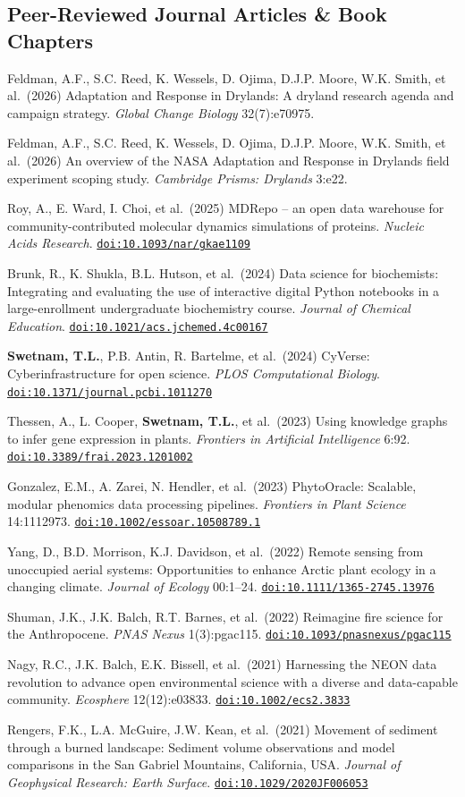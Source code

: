 \documentclass[11pt,letterpaper]{article}
\newcommand{\me}{\textbf{Swetnam, T.L.}}
\newcommand{\doi}[1]{\href{https://doi.org/#1}{\nolinkurl{doi:#1}}}
\newcounter{revno}
\newenvironment{revlist}[1]
  {\setcounter{revno}{#1}\stepcounter{revno}%
   \begin{list}{}{\setlength{\leftmargin}{2.1em}\setlength{\labelwidth}{1.7em}%
     \setlength{\labelsep}{0.4em}\setlength{\itemsep}{3.5pt}\setlength{\parsep}{0pt}\setlength{\topsep}{2pt}}}
  {\end{list}}
\newcommand{\pub}{\addtocounter{revno}{-1}\item[{\small\color{muted}\arabic{revno}.}]}
\begin{document}
\subsection{Peer-Reviewed Journal Articles \& Book Chapters}
\begin{revlist}{40}
\pub Feldman, A.F., S.C. Reed, K. Wessels, D. Ojima, D.J.P. Moore, W.K. Smith, et al.\ (2026) Adaptation and Response in Drylands: A dryland research agenda and campaign strategy. \textit{Global Change Biology} 32(7):e70975.
\pub Feldman, A.F., S.C. Reed, K. Wessels, D. Ojima, D.J.P. Moore, W.K. Smith, et al.\ (2026) An overview of the NASA Adaptation and Response in Drylands field experiment scoping study. \textit{Cambridge Prisms: Drylands} 3:e22.
\pub Roy, A., E. Ward, I. Choi, et al.\ (2025) MDRepo -- an open data warehouse for community-contributed molecular dynamics simulations of proteins. \textit{Nucleic Acids Research}. \doi{10.1093/nar/gkae1109}
\pub Brunk, R., K. Shukla, B.L. Hutson, et al.\ (2024) Data science for biochemists: Integrating and evaluating the use of interactive digital Python notebooks in a large-enrollment undergraduate biochemistry course. \textit{Journal of Chemical Education}. \doi{10.1021/acs.jchemed.4c00167}
\pub \me, P.B. Antin, R. Bartelme, et al.\ (2024) CyVerse: Cyberinfrastructure for open science. \textit{PLOS Computational Biology}. \doi{10.1371/journal.pcbi.1011270}
\pub Thessen, A., L. Cooper, \me, et al.\ (2023) Using knowledge graphs to infer gene expression in plants. \textit{Frontiers in Artificial Intelligence} 6:92. \doi{10.3389/frai.2023.1201002}
\pub Gonzalez, E.M., A. Zarei, N. Hendler, et al.\ (2023) PhytoOracle: Scalable, modular phenomics data processing pipelines. \textit{Frontiers in Plant Science} 14:1112973. \doi{10.1002/essoar.10508789.1}
\pub Yang, D., B.D. Morrison, K.J. Davidson, et al.\ (2022) Remote sensing from unoccupied aerial systems: Opportunities to enhance Arctic plant ecology in a changing climate. \textit{Journal of Ecology} 00:1--24. \doi{10.1111/1365-2745.13976}
\pub Shuman, J.K., J.K. Balch, R.T. Barnes, et al.\ (2022) Reimagine fire science for the Anthropocene. \textit{PNAS Nexus} 1(3):pgac115. \doi{10.1093/pnasnexus/pgac115}
\pub Nagy, R.C., J.K. Balch, E.K. Bissell, et al.\ (2021) Harnessing the NEON data revolution to advance open environmental science with a diverse and data-capable community. \textit{Ecosphere} 12(12):e03833. \doi{10.1002/ecs2.3833}
\pub Rengers, F.K., L.A. McGuire, J.W. Kean, et al.\ (2021) Movement of sediment through a burned landscape: Sediment volume observations and model comparisons in the San Gabriel Mountains, California, USA. \textit{Journal of Geophysical Research: Earth Surface}. \doi{10.1029/2020JF006053}

\end{revlist}
\end{document}
